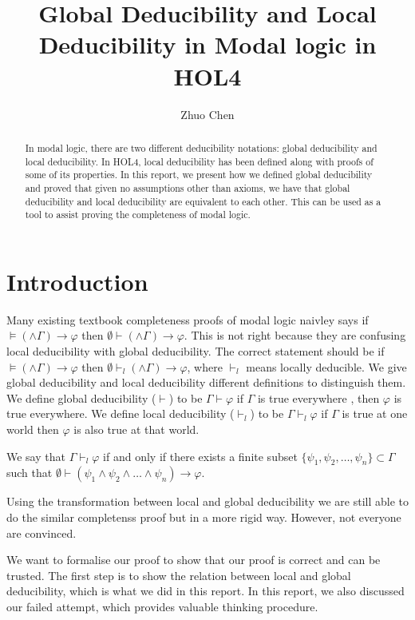 \documentclass[submission,copyright,creativecommons]{eptcs}
\title{Global Deducibility and Local Deducibility in Modal logic in HOL4}
\author{Zhuo Chen
\institute{
University of Australian National University\\
Canberra, Australia}
\email{zhuo.chen1@anu.edu.au}
}
\begin{document}
\maketitle

\begin{abstract}
In modal logic, there are two different deducibility notations: global deducibility 
and local deducibility. In HOL4, local deducibility has been defined along with proofs 
of some of its properties. In this report, we present how we defined global deducibility
and proved that given no assumptions other than axioms, we have that global deducibility and local deducibility
are equivalent to each other. This can be used as a tool to assist proving the completeness 
of modal logic.  
\end{abstract}

\section{Introduction}

Many existing textbook completeness proofs of modal logic naivley says if $\models (\wedge \Gamma) \rightarrow \varphi$ 
then $\emptyset \vdash (\wedge \Gamma) \rightarrow \varphi$. 
This is not right because they are confusing local deducibility with 
global deducibility. The correct statement should be if
$\models (\wedge \Gamma) \rightarrow \varphi$ 
then $\emptyset \vdash_l (\wedge \Gamma) \rightarrow \varphi$,
where $\vdash_l$ means locally deducible. 
We give global deducibility and local deducibility different definitions 
to distinguish them.
We define global deducibility ($\vdash$) to be $\Gamma \vdash \varphi$ if $\Gamma$ is true everywhere
, then $\varphi$ is true everywhere.
We define local deducibility ($\vdash_l$) to be $\Gamma \vdash_l \varphi$ 
if $\Gamma$ is true at one world then $\varphi$ is also true at that world.

We say that $\Gamma \vdash_l \varphi$ if and only if there exists a 
finite subset $\{\psi_1, \psi_2,\dots, \psi_n\} \subset \Gamma$ 
such that $\emptyset \vdash (\psi_1 \wedge \psi_2 \wedge \dots \wedge \psi_n) \rightarrow \varphi$.


Using the transformation between local and global deducibility we 
are still able to do the similar completenss proof but in a more 
rigid way. However, not everyone are convinced.

We want to formalise our proof to show that our proof is correct and 
can be trusted. The first step is to show the relation between local and global deducibility,
which is what we did in this report. 
In this report, we also discussed our failed attempt, which provides 
valuable thinking procedure. 
\end{document}
